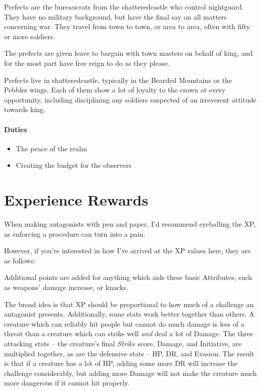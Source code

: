 \begin{multicols}{2}
Prefects are the bureaucrats from the \gls{shatteredcastle} who control \gls{nightguard}.
They have no military background, but have the final say on all matters concerning war.
They travel from town to town, or area to area, often with fifty or more soldiers.

The prefects are given leave to bargain with town masters on behalf of \gls{king}, and for the most part have free reign to do as they please.

Prefects live in \gls{shatteredcastle}, typically in the Bearded Mountains or the Pebbles wings.
Each of them show a lot of loyalty to the crown at every opportunity, including disciplining any soldiers suspected of an irreverent attitude towards \gls{king}.

\subsubsection{Duties}

\begin{itemize}

	\item{The peace of the realm}
	\item{Creating the budget for the observers}

\end{itemize}

\end{multicols}

\chapter{Experience Rewards}

\begin{multicols}{2}

\noindent When making antagonists with pen and paper, I'd recommend eyeballing the XP, as enforcing a procedure can turn into a pain.

However, if you're interested in how I've arrived at the XP values here, they are as follows:

Additional points are added for anything which aids these basic Attributes, such as weapons' damage increase, or knacks.

The broad idea is that XP should be proportional to how much of a challenge an antagonist presents.
Additionally, some stats work better together than others.
A creature which can reliably hit people but cannot do much damage is less of a threat than a creature which can strike well \emph{and} deal a lot of Damage.
The three attacking stats -- the creature's final \textit{Strike} score, Damage, and Initiative, are multiplied together, as are the defensive stats -- HP, DR, and Evasion.
The result is that if a creature has a lot of HP, adding some more DR will increase the challenge considerably, but adding more Damage will not make the creature much more dangerous if it cannot hit properly.

\end{multicols}

